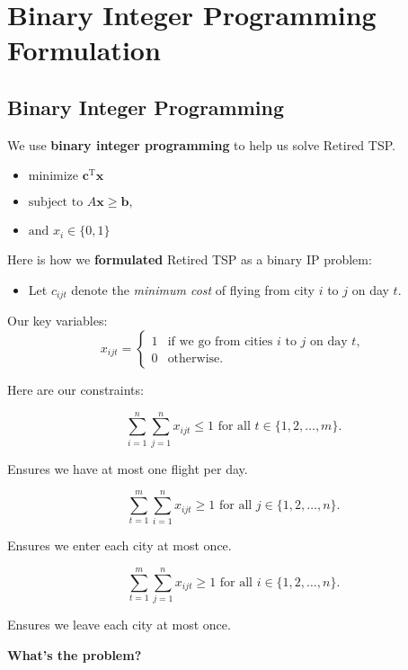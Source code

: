 \documentclass[10pt, xcolor=svgnames]{beamer}
\begin{document}
\section{Binary Integer Programming Formulation}

\subsection{Binary Integer Programming}

\begin{frame}
We use \textbf{binary integer programming} to help us solve Retired TSP.

\begin{itemize}
    \item $\text{minimize }   \mathbf{c}^\mathrm{T} \mathbf{x} $
    \item $\text{subject to } A \mathbf{x} \ge \mathbf{b},$
    \item $\text{and } x_i \in \{0,1\}$
\end{itemize}

\pause
Here is how we \textbf{formulated} Retired TSP as a binary IP problem:

\begin{itemize}
    \item Let $c_{ijt}$ denote the \emph{minimum cost} of flying from city $i$ to $j$ on day $t$.
\end{itemize}
Our key variables:
\[
x_{ijt} = \begin{cases}
1 &\mbox{if we go from cities } i \mbox{ to } j \mbox{ on day } t, \\ 
0 & \mbox{otherwise}.
\end{cases}
\]
\end{frame}

\begin{frame}
Here are our constraints:

\begin{equation}
\sum_{i=1}^{n} \sum_{j=1}^{n} x_{ijt} \le 1 \mbox{ for all } t \in \{1, 2, \ldots, m\}.
\end{equation}

Ensures we have at most one flight per day.

\pause
\begin{equation}
\sum_{t=1}^{m} \sum_{i=1}^{n} x_{ijt} \ge 1 \mbox{ for all } j \in \{1, 2, \ldots, n\}.
\end{equation}

Ensures we enter each city at most once.

\pause
\begin{equation}
\sum_{t=1}^{m} \sum_{j=1}^{n} x_{ijt} \ge 1 \mbox{ for all } i \in \{1, 2, \ldots, n\}.
\end{equation}

Ensures we leave each city at most once.\\
\pause

\textbf{What's the problem?}
\end{frame}
\end{document}
